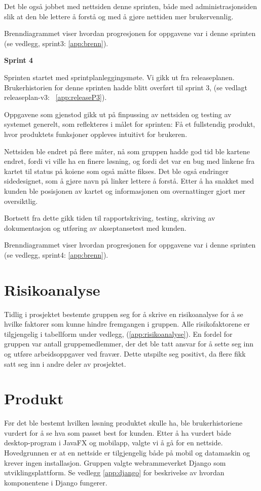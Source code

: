 \documentclass[12pt,a4paper,norsk]{article}
\begin{document}
Det ble også jobbet med nettsiden denne sprinten, både med administrasjonsiden slik at den ble lettere å forstå og med å gjøre nettiden mer brukervennlig.

Brenndiagrammet viser hvordan progresjonen for oppgavene var i denne sprinten (se vedlegg, sprint3: \cref{app:brenn}).

\bigskip \noindent \textbf{Sprint 4}
\par Sprinten startet med sprintplanleggingsmøte. Vi gikk ut fra releaseplanen. Brukerhistorien for denne sprinten hadde blitt overført til sprint 3, (se vedlagt releaseplan-v3: ~\cref{app:releaseP3}).
\par Oppgavene som gjenstod gikk ut på finpussing av nettsiden og testing av systemet generelt, som reflekteres i målet for sprinten: Få et fullstendig produkt, hvor produktets funksjoner oppleves intuitivt for brukeren.

Nettsiden ble endret på flere måter, nå som gruppen hadde god tid ble kartene endret, fordi vi ville ha en finere løsning, og fordi det var en bug med linkene fra kartet til status på koiene som også måtte fikses. Det ble også endringer sidedesignet, som å gjøre navn på linker lettere å forstå. Etter å ha snakket med kunden ble posisjonen av kartet og informasjonen om overnattinger gjort mer oversiktlig.

Bortsett fra dette gikk tiden til rapportskriving, testing, skriving av dokumentasjon og utføring av akseptansetest med kunden.

Brenndiagrammet viser hvordan progresjonen for oppgavene var i denne sprinten (se vedlegg, sprint4: \cref{app:brenn}).


  \section{Risikoanalyse}
  Tidlig i prosjektet bestemte gruppen seg for å skrive en risikoanalyse for å se hvilke faktorer som kunne hindre fremgangen i gruppen. Alle risikofaktorene er tilgjengelig i tabellform under vedlegg, (\cref{app:risikoanalyse}). En fordel for gruppen var antall gruppemedlemmer, der det ble tatt ansvar for å sette seg inn og utføre arbeidsoppgaver ved fravær. Dette utspilte seg positivt, da flere fikk satt seg inn i andre deler av prosjektet.

  \section{Produkt}
  Før det ble bestemt hvilken løsning produktet skulle ha, ble brukerhistoriene vurdert for å se hva som passet best for kunden. Etter å ha vurdert både desktop-program i JavaFX og mobilapp, valgte vi å gå for en nettside. Hovedgrunnen er at en nettside er tilgjengelig både på mobil og datamaskin og krever ingen installasjon. Gruppen valgte webrammeverket Django som utviklingsplattform. Se vedlegg \cref{app:django} for beskrivelse av hvordan komponentene i Django fungerer.
\end{document}
